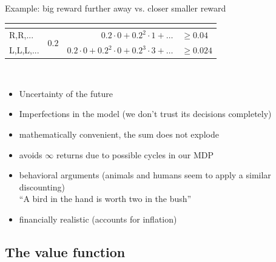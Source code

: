 \begin{frame}{Example: big reward further away vs. closer smaller reward}
{\begin{table}[h]
{\begin{tabular}{lcrl}
                                & \multicolumn{1}{l}{}               & \multicolumn{1}{l}{}                                                       &                                                 \\ \hline
\multicolumn{1}{|l|}{R,R,...}   & \multicolumn{1}{c|}{\multirow{2}{*}{$0.2$}}         & $0.2 \cdot 0 + 0.2^2 \cdot 1 + \ldots$                                     & \multicolumn{1}{l|}{$\ge \mathbf{0.04}$}                  \\   \cline{1-1} \cline{3-4}
\multicolumn{1}{|l|}{L,L,L,...} & \multicolumn{1}{l|}{}              & $0.2 \cdot 0 + 0.2^2 \cdot 0 + 0.2^3 \cdot 3 +\ldots$              & \multicolumn{1}{l|}{$\ge {0.024}$}                \\ \hline
\end{tabular}%
}

\end{table}
}

\end{frame}

\begin{frame}

\\

\pause

\begin{itemize}
\item Uncertainty of the future
\item Imperfections in the model (we don't trust its decisions completely)
\item mathematically convenient, the sum does not explode
\item avoids $\infty$ returns due to possible cycles in our MDP
\item behavioral arguments (animals and humans seem to apply a similar discounting)\\
``A bird in the hand is worth two in the bush''
\item financially realistic (accounts for inflation)
\end{itemize}

\end{frame} 

\newpage

\subsection{The value function}


